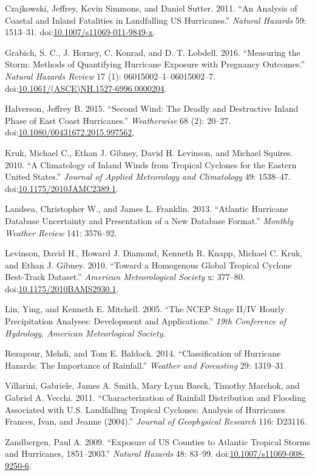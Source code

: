 \documentclass[]{elsarticle} %
\begin{document}
\hypertarget{ref-Czajkowski2011}{}
Czajkowski, Jeffrey, Kevin Simmons, and Daniel Sutter. 2011. ``An
Analysis of Coastal and Inland Fatalities in Landfalling US
Hurricanes.'' \emph{Natural Hazards} 59: 1513--31.
doi:\href{https://doi.org/10.1007/s11069-011-9849-x}{10.1007/s11069-011-9849-x}.

\hypertarget{ref-Grabich2016}{}
Grabich, S. C., J. Horney, C. Konrad, and D. T. Lobdell. 2016.
``Measuring the Storm: Methods of Quantifying Hurricane Exposure with
Pregnancy Outcomes.'' \emph{Natural Hazards Review} 17 (1):
06015002--1--06015002--7.
doi:\href{https://doi.org/10.1061/(ASCE)NH.1527-6996.0000204}{10.1061/(ASCE)NH.1527-6996.0000204}.

\hypertarget{ref-Halverson2015}{}
Halverson, Jeffrey B. 2015. ``Second Wind: The Deadly and Destructive
Inland Phase of East Coast Hurricanes.'' \emph{Weatherwise} 68 (2):
20--27.
doi:\href{https://doi.org/10.1080/00431672.2015.997562}{10.1080/00431672.2015.997562}.

\hypertarget{ref-Kruk2010}{}
Kruk, Michael C., Ethan J. Gibney, David H. Levinson, and Michael
Squires. 2010. ``A Climatology of Inland Winds from Tropical Cyclones
for the Eastern United States.'' \emph{Journal of Applied Meteorology
and Climatology} 49: 1538--47.
doi:\href{https://doi.org/10.1175/2010JAMC2389.1}{10.1175/2010JAMC2389.1}.

\hypertarget{ref-Landsea2013}{}
Landsea, Christopher W., and James L. Franklin. 2013. ``Atlantic
Hurricane Database Uncertainty and Presentation of a New Database
Format.'' \emph{Monthly Weather Review} 141: 3576--92.

\hypertarget{ref-Levinson2010}{}
Levinson, David H., Howard J. Diamond, Kenneth R. Knapp, Michael C.
Kruk, and Ethan J. Gibney. 2010. ``Toward a Homogenous Global Tropical
Cyclone Best-Track Dataset.'' \emph{American Meteorological Society} x:
377--80.
doi:\href{https://doi.org/10.1175/2010BAMS2930.1}{10.1175/2010BAMS2930.1}.

\hypertarget{ref-Lin2005}{}
Lin, Ying, and Kenneth E. Mitchell. 2005. ``The NCEP Stage II/IV Hourly
Precipitation Analyses: Development and Applications.'' \emph{19th
Conference of Hydrology, American Meteorlogical Society}.

\hypertarget{ref-Rezapour2014}{}
Rezapour, Mehdi, and Tom E. Baldock. 2014. ``Classification of Hurricane
Hazards: The Importance of Rainfall.'' \emph{Weather and Forcasting} 29:
1319--31.

\hypertarget{ref-Villarini2011}{}
Villarini, Gabriele, James A. Smith, Mary Lynn Baeck, Timothy Marchok,
and Gabriel A. Vecchi. 2011. ``Characterization of Rainfall Distribution
and Flooding Associated with U.S. Landfalling Tropical Cyclones:
Analysis of Hurricanes Frances, Ivan, and Jeanne (2004).'' \emph{Journal
of Geophysical Research} 116: D23116.

\hypertarget{ref-Zandbergen2009}{}
Zandbergen, Paul A. 2009. ``Exposure of US Counties to Atlantic Tropical
Storms and Hurricanes, 1851--2003.'' \emph{Natural Hazards} 48: 83--99.
doi:\href{https://doi.org/10.1007/s11069-008-9250-6}{10.1007/s11069-008-9250-6}.
\end{document}
